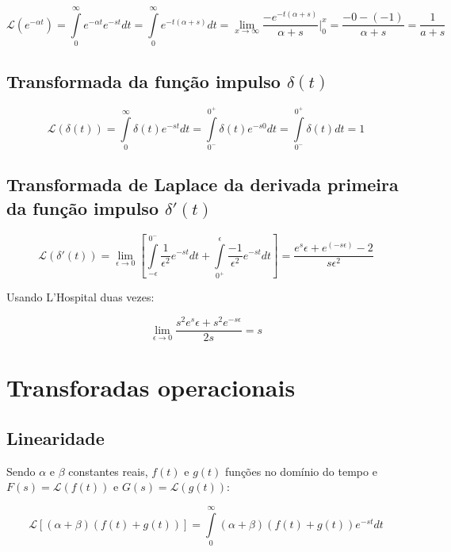 \documentclass[12pt,fleqn]{book} %
\begin{document}
\begin{equation}
\mathscr{L}(e^{-\alpha t}) = \int\limits_{0}^{\infty}e^{-\alpha t}e^{-st}dt = \int\limits_{0}^{\infty}e^{-t(\alpha+s)}dt = \lim_{x\rightarrow\infty}\frac{-e^{-t(\alpha+s)}}{\alpha+s}\Biggr|_0^x = \frac{-0-(-1)}{\alpha+s} = \frac{1}{a+s}
\end{equation}

\subsection{Transformada da função impulso $\delta(t)$}

\begin{equation}
\mathscr{L}(\delta(t)) = \int\limits_{0}^{\infty}\delta(t)e^{-st}dt = \int\limits_{0^-}^{0^+}\delta(t)e^{-s0}dt = \int\limits_{0^-}^{0^+}\delta (t)dt = 1
\end{equation}

\subsection{Transformada de Laplace da derivada primeira da função impulso $\delta'(t)$}

\begin{equation}
\mathscr{L}(\delta'(t)) = \lim_{\epsilon\rightarrow0}[\int\limits_{-\epsilon}^{0^-}\frac{1}{\epsilon^2}e^{-st}dt + \int\limits_{0^+}^{\epsilon}\frac{-1}{\epsilon^2}e^{-st}dt] = \frac{e^s\epsilon+e^(-s\epsilon)-2}{s\epsilon^2}
\end{equation}

Usando L'Hospital duas vezes:

\begin{equation}
\lim_{\epsilon\rightarrow0}\frac{s^2 e^s\epsilon+s^2 e^{-s\epsilon}}{2s} = s
\end{equation}
    
    \section{Transforadas operacionais}
    
    \subsection{Linearidade}
    
Sendo $\alpha$ e $\beta$ constantes reais, $f(t)$ e $g(t)$ funções no domínio do tempo e $F(s) = \mathscr{L}(f(t))$ e $G(s) = \mathscr{L}(g(t))$:

\begin{equation}
\mathscr{L}[(\alpha+\beta)(f(t)+g(t))] = \int\limits_{0}^{\infty}(\alpha+\beta)(f(t)+g(t))e^{-st}dt
\end{equation}
\end{document}
